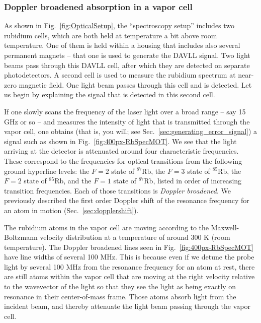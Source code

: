 \documentclass{../lab}
\begin{document}
\subsubsection{Doppler broadened absorption in a vapor cell}

As shown in Fig.\ \ref{fig:OpticalSetup}, the ``spectroscopy setup'' includes two rubidium cells, which are both held at temperature a bit above room temperature.  One of them is held within a housing that includes also several permanent magnets -- that one is used to generate the DAVLL signal.  Two light beams pass through this DAVLL cell, after which they are detected on separate photodetectors.  A second cell is used to measure the rubidium spectrum at near-zero magnetic field.   One light beam passes through this cell and is detected.  Let us begin by explaining the signal that is detected in this second cell.

If one slowly scans the frequency of the laser light over a broad range -- say 15 GHz or so -- and measures the intensity of light that is transmitted through the vapor cell, one obtains (that is, you will; see Sec.\ \ref{sec:generating_error_signal}) a signal such as shown in Fig.\ \ref{fig:400px-RbSpecMOT}.  We see that the light arriving at the detector is attenuated around four characteristic frequencies.  These correspond to the frequencies for optical transitions from the following ground hyperfine levels: the $F=2$ state of $^{87}$Rb, the $F=3$ state of  $^{85}$Rb, the $F=2$ state of  $^{85}$Rb, and the  $F=1$ state of  $^{87}$Rb, listed in order of increasing transition frequencies. Each of those transitions is \emph{Doppler broadened}.  We previously described the first order Doppler shift of the resonance frequency for an atom in motion (Sec.\ \ref{sec:dopplershift}).  

The rubidium atoms in the vapor cell are moving according to the Maxwell-Boltzmann velocity distribution at a temperature of around 300 K (room temperature).  The Doppler broadened lines seen in Fig.\ \ref{fig:400px-RbSpecMOT} have line widths of several 100 MHz.  This is because even if we detune the probe light by several 100 MHz from the resonance frequency for an atom at rest, there are still atoms within the vapor cell that are moving at the right velocity relative to the wavevector of the light so that they see the light as being exactly on resonance in their center-of-mass frame.  Those atoms absorb light from the incident beam, and thereby attenuate the light beam passing through the vapor cell.
\end{document}

